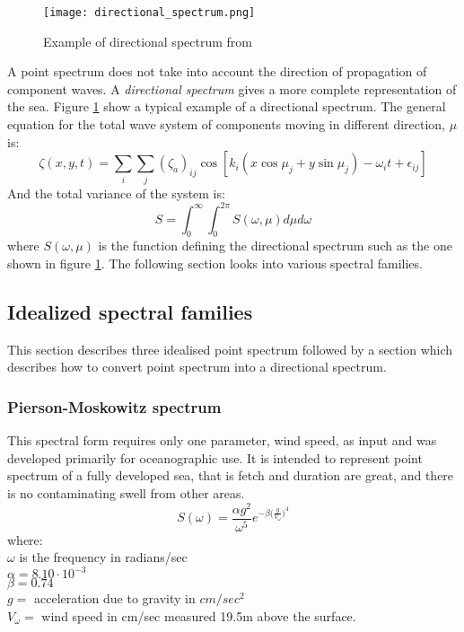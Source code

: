 \begin{figure}
  \centering
  \texttt{[image: directional\_spectrum.png]}
  \caption{Example of directional spectrum from \cite{hughes2010ship}}
  \label{fig: directional spectrum}
\end{figure}

A point spectrum does not take into account the direction of propagation of
component waves. A \textit{directional spectrum} gives a more complete
representation of the sea. Figure \ref{fig: directional spectrum} show a typical
example of a directional spectrum. The general equation for the total wave
system of components moving in different direction, $\mu$ is:
\begin{equation}
  \zeta(x,y,t) = \sum _i \sum _j (\zeta_a)_{ij} \cos[k_i (x \cos \mu_j + 
  y \sin \mu_j) - \omega_i t + \epsilon_{ij}]
  \label{eq: equation of ocean wave system}
\end{equation}
And the total variance of the system is:
\begin{equation}
  S = \int_{0}^{\infty} \int_{0}^{2\pi} S(\omega, \mu) d\mu d\omega
  \label{eq: total variance for ocean wave system}
\end{equation}
where $S(\omega, \mu)$ is the function defining the directional spectrum such as
the one shown in figure \ref{fig: directional spectrum}. The following section
looks into various spectral families.

\subsection{Idealized spectral families} \label{Idealized spectral families}

This section describes three idealised point spectrum followed by a section
which describes how to convert point spectrum into a directional spectrum.

\subsubsection{Pierson-Moskowitz spectrum} \label{Pierson-Moskowitz spectrum}
This spectral form requires only one parameter, wind speed, as input and was
developed primarily for oceanographic use. It is intended to represent point
spectrum of a fully developed sea, that is fetch and duration are great, and
there is no contaminating swell from other areas. 
\begin{equation}
  S(\omega) = \frac{\alpha g^2}{\omega^5} 
    e^{ -\beta \big(\frac{g}{V_{\omega}} \big)^4 }
  \label {eq: pierson moskowitz spectrum}
\end{equation}
where:\\
$\omega$ is the frequency in radians/sec\\
$\alpha = 8.10 \cdot 10^{-3}$\\
$\beta = 0.74$ \\
$g =$ acceleration due to gravity in $cm/sec^2$\\
$V_{\omega} =$ wind speed in cm/sec measured 19.5m above the surface.\\

